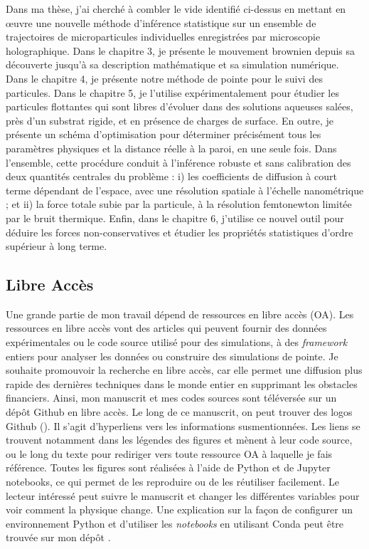 Dans ma thèse, j'ai cherché à combler le vide identifié ci-dessus en mettant en œuvre une nouvelle méthode d'inférence statistique sur un ensemble de trajectoires de microparticules individuelles enregistrées par microscopie holographique. Dans le chapitre 3, je présente le mouvement brownien depuis sa découverte jusqu'à sa description mathématique et sa simulation numérique. Dans le chapitre 4, je présente notre méthode de pointe pour le suivi des particules. Dans le chapitre 5, je l'utilise expérimentalement pour étudier les particules flottantes qui sont libres d'évoluer dans des solutions aqueuses salées, près d'un substrat rigide, et en présence de charges de surface. En outre, je présente un schéma d'optimisation pour déterminer précisément tous les paramètres physiques et la distance réelle à la paroi, en une seule fois. Dans l'ensemble, cette procédure conduit à l'inférence robuste et sans calibration des deux quantités centrales du problème : i) les coefficients de diffusion à court terme dépendant de l'espace, avec une résolution spatiale à l'échelle nanométrique ; et ii) la force totale subie par la particule, à la résolution femtonewton limitée par le bruit thermique. Enfin, dans le chapitre 6, j'utilise ce nouvel outil pour déduire les forces non-conservatives et étudier les propriétés statistiques d'ordre supérieur à long terme.




\subsection{Libre Accès}

Une grande partie de mon travail dépend de ressources en libre accès (OA). Les ressources en libre accès vont des articles qui peuvent fournir des données expérimentales ou le code source utilisé pour des simulations, à des \textit{framework} entiers pour analyser les données ou construire des simulations de pointe. Je souhaite promouvoir la recherche en libre accès, car elle permet une diffusion plus rapide des dernières techniques dans le monde entier en supprimant les obstacles financiers. Ainsi, mon manuscrit et mes codes sources sont téléversée sur un dépôt Github en libre accès. Le long de ce manuscrit, on peut trouver des logos Github (\href{https://github.com/eXpensia/Ma-these/}{\faGithub}). Il s'agit d'hyperliens vers les informations susmentionnées. Les liens se trouvent notamment dans les légendes des figures et mènent à leur code source, ou le long du texte pour rediriger vers toute ressource OA à laquelle je fais référence. Toutes les figures sont réalisées à l'aide de Python et de Jupyter notebooks, ce qui permet de les reproduire ou de les réutiliser facilement. Le lecteur intéressé peut suivre le manuscrit et changer les différentes variables pour voir comment la physique change.  Une explication sur la façon de configurer un environnement Python et d'utiliser les \textit{notebooks} en utilisant Conda peut être trouvée sur mon dépôt \href{https://github.com/eXpensia/Ma-these/}{\faGithub}.




